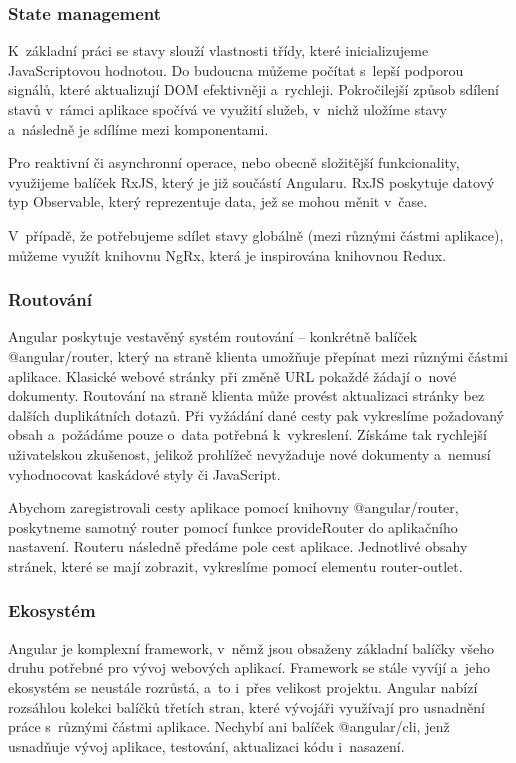 \subsubsection{State management}

K~základní práci se stavy slouží vlastnosti třídy, které inicializujeme JavaScriptovou hodnotou. 
Do budoucna můžeme počítat s~lepší podporou signálů, které aktualizují DOM efektivněji a~rychleji. 
Pokročilejší způsob sdílení stavů v~rámci aplikace spočívá ve využití služeb, v~nichž uložíme stavy a~následně je sdílíme mezi komponentami.\cite{angulardev}

Pro reaktivní či asynchronní operace, nebo obecně složitější funkcionality, využijeme balíček RxJS, který je již součástí Angularu. 
RxJS poskytuje datový typ Observable, který reprezentuje data, jež se mohou měnit v~čase.\cite{angulario,rxjslibrary}

V~případě, že potřebujeme sdílet stavy globálně (mezi různými částmi aplikace), můžeme využít knihovnu NgRx, která je inspirována knihovnou Redux.\cite{angularstatemanagement,ngrxlib}

\subsubsection{Routování}

Angular poskytuje vestavěný systém routování -- konkrétně balíček @angular/router, který na straně klienta umožňuje přepínat mezi různými částmi aplikace. 
Klasické webové stránky při změně URL pokaždé žádají o~nové dokumenty. Routování na straně klienta může provést aktualizaci stránky bez dalších duplikátních dotazů. 
Při vyžádání dané cesty pak vykreslíme požadovaný obsah a~požádáme pouze o~data potřebná k~vykreslení. 
Získáme tak rychlejší uživatelskou zkušenost, jelikož prohlížeč nevyžaduje nové dokumenty a~nemusí vyhodnocovat kaskádové styly či JavaScript.

Abychom zaregistrovali cesty aplikace pomocí knihovny @angular/router, poskytneme samotný router pomocí funkce provideRouter do aplikačního nastavení. 
Routeru následně předáme pole cest aplikace. Jednotlivé obsahy stránek, které se mají zobrazit, vykreslíme pomocí elementu router-outlet.\cite{angulardev,learningangular}

\subsubsection{Ekosystém}

Angular je komplexní framework, v~němž jsou obsaženy základní balíčky všeho druhu potřebné pro vývoj webových aplikací. 
Framework se stále vyvíjí a~jeho ekosystém se neustále rozrůstá, a~to i~přes velikost projektu. 
Angular nabízí rozsáhlou kolekci balíčků třetích stran, které vývojáři využívají pro usnadnění práce s~různými částmi aplikace. 
Nechybí ani balíček @angular/cli, jenž usnadňuje vývoj aplikace, testování, aktualizaci kódu i~nasazení.\cite{angulardev,learningangular}